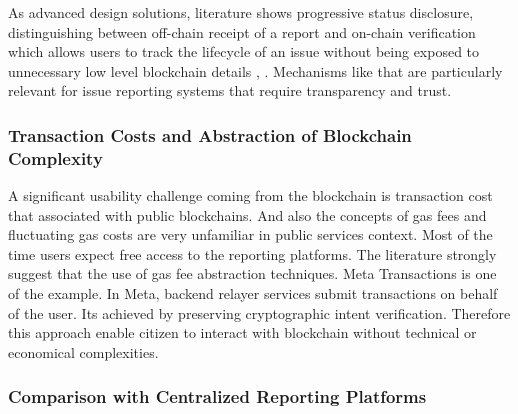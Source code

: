 As advanced design solutions, literature shows progressive status disclosure, distinguishing between off-chain receipt of a report and on-chain verification which allows users to track the lifecycle of an issue without being exposed to unnecessary low level blockchain details \cite{dzone2026blockchainai}, \cite{marian2025transparent}. Mechanisms like that are particularly relevant for issue reporting systems that require transparency and trust.

\subsubsection{Transaction Costs and Abstraction of Blockchain Complexity}


A significant usability challenge coming from the blockchain is transaction cost that associated with public blockchains. And also the concepts of gas fees and fluctuating gas costs are very unfamiliar in public services context. Most of the time users expect free access to the reporting platforms\cite{mdpi2025usercentric}. The literature strongly suggest that the use of gas fee abstraction techniques. Meta Transactions is one of the example. In Meta, backend relayer services submit transactions on behalf of the user. Its achieved by preserving cryptographic intent verification\cite{sonule2025uxweb3}. Therefore this approach enable citizen to interact with blockchain without technical or economical complexities.


\subsubsection{Comparison with Centralized Reporting Platforms}


